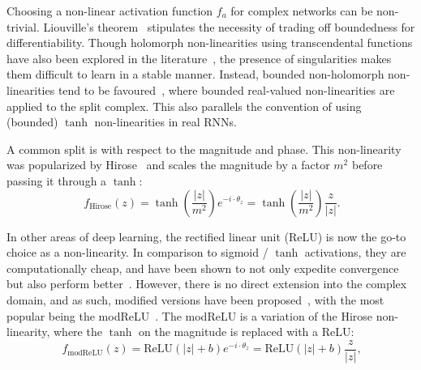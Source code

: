 \documentclass{article}
\begin{document}
Choosing a non-linear activation function $f_a$ for complex networks can be non-trivial.  Liouville's theorem~\cite{Liouville} stipulates the necessity of trading off boundedness for differentiability.  Though holomorph non-linearities using transcendental functions have also been explored in the literature~\cite{Mandic}, the presence of singularities makes them difficult to learn in a stable manner.  Instead, bounded non-holomorph non-linearities tend to be favoured~\cite{hirose2013complex,Mandic}, where bounded real-valued non-linearities are applied to the split complex.  This also parallels the convention of using (bounded) $\tanh$ non-linearities in real RNNs.

A common split is with respect to the magnitude and phase.  This non-linearity was popularized by Hirose~\cite{hirose2013complex} and scales the magnitude by a factor $m^2$ before passing it through a $\tanh$: 
\begin{equation}~\label{eq:Hirose}
    f_{\text{Hirose}}(z) = \tanh\left(\frac{|z|}{m^2}\right)e^{-i \cdot \theta_z} = \tanh\left(\frac{|z|}{m^2}\right)\frac{z}{|z|}.
\end{equation}

In other areas of deep learning, the rectified linear unit (ReLU) is now the go-to choice as a non-linearity.  In comparison to sigmoid / $\tanh$ activations, they are computationally cheap, and have been shown to not only expedite convergence~\cite{Krizhevsky} but also perform better~\cite{Nair,Maas,Zeiler}.  However, there is no direct extension into the complex domain, and as such, modified versions have been proposed~\cite{Guberman,Virtue}, with the most popular being the modReLU~\cite{Arjovsky}.  The modReLU is a variation of the Hirose non-linearity, where the $\tanh$ on the magnitude is replaced with a ReLU:
\begin{equation}~\label{eq:modrelu}
    f_{\text{modReLU}}(z) = \text{ReLU}(|z| + b)e^{-i \cdot \theta_z} = \text{ReLU}(|z| + b)\frac{z}{|z|},
\end{equation}
\end{document}
